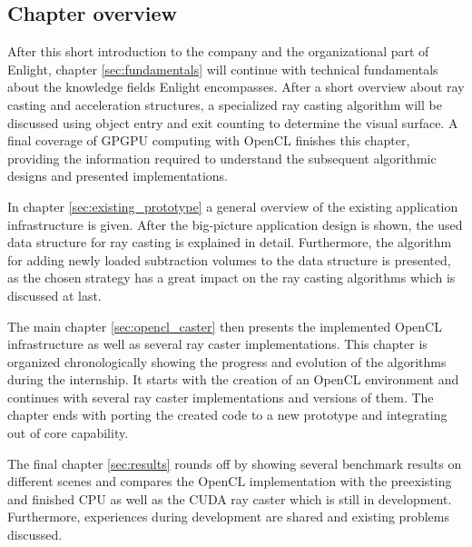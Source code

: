 \subsection{Chapter overview}

After this short introduction to the company and the organizational part of Enlight,  chapter \ref{sec:fundamentals} will continue with technical fundamentals about the knowledge fields Enlight encompasses. After a short overview about ray casting and acceleration structures, a specialized ray casting algorithm will be discussed using object entry and exit counting to determine the visual surface. A final coverage of GPGPU computing with OpenCL finishes this chapter, providing the information required to understand the subsequent algorithmic designs and presented implementations.

In chapter \ref{sec:existing_prototype} a general overview of the existing application infrastructure is given. After the big-picture application design is shown, the used data structure for ray casting is explained in detail. Furthermore, the algorithm for adding newly loaded subtraction volumes to the data structure is presented, as the chosen strategy has a great impact on the ray casting algorithms which is discussed at last.

The main chapter \ref{sec:opencl_caster} then presents the implemented OpenCL infrastructure as well as several ray caster implementations. This chapter is organized chronologically showing the progress and evolution of the algorithms during the internship. It starts with the creation of an OpenCL environment and continues with several ray caster implementations and versions of them. The chapter ends with porting the created code to a new prototype and integrating out of core capability.

The final chapter \ref{sec:results} rounds off by showing several benchmark results on different scenes and compares the OpenCL implementation with the preexisting and finished CPU as well as the CUDA ray caster which is still in development. Furthermore, experiences during development are shared and existing problems discussed.
 